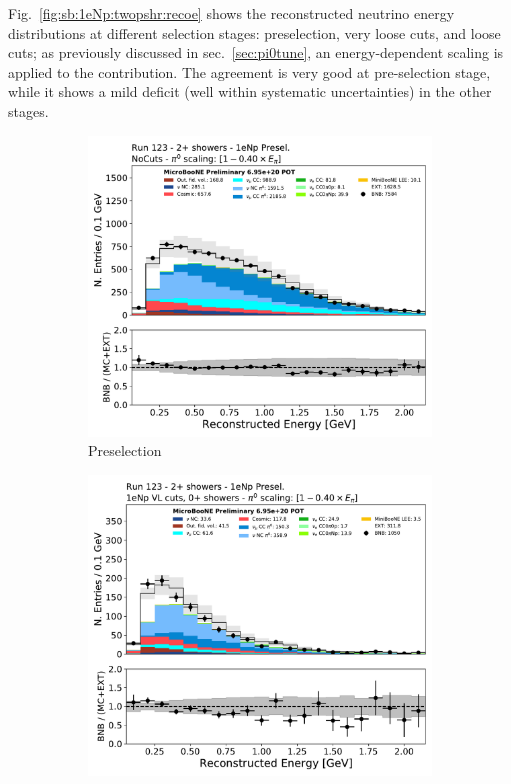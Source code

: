 Fig.~\ref{fig:sb:1eNp:twopshr:recoe} shows the reconstructed neutrino energy distributions at different selection stages: \npsel preselection, very loose cuts, and loose cuts; as previously discussed in sec.~\ref{sec:pi0tune}, an energy-dependent scaling is applied to the \pizero contribution. The agreement is very good at pre-selection stage, while it shows a mild deficit (well within systematic uncertainties) in the other stages.

\begin{figure}[H]
    \begin{center}
    \begin{subfigure}{0.32\textwidth}
    \includegraphics[width=1.00\textwidth]{Sidebands/Figures/1eNp/TwoShower/TwoPShr_NP_None_pi0e040/reco_e.pdf}
    \caption{\npsel Preselection}
    \end{subfigure}
    \begin{subfigure}{0.32\textwidth}
    \includegraphics[width=1.00\textwidth]{Sidebands/Figures/1eNp/TwoShower/TwoPShr_NP_NPVLAllShr_pi0e040/reco_e.pdf}

\end{subfigure}
\end{center}
\end{figure}
